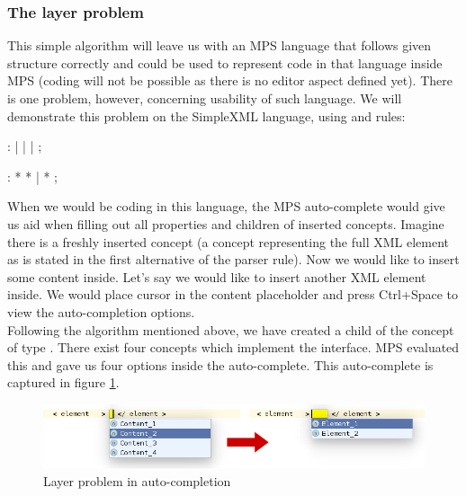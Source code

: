 \subsubsection{The layer problem}

This simple algorithm will leave us with an MPS language that follows given structure correctly and could be used to represent code in that language inside MPS (coding will not be possible as there is no editor aspect defined yet). There is one problem, however, concerning usability of such language. We will demonstrate this problem on the SimpleXML language, using  and  rules:

\begin{antlr}
	    :   
           |   
           |   
           |   
           ;
	
	    :   \literal{<}  * \literal{>} * \literal{</}  \literal{>}
           |   \literal{<}  * \literal{/>}
           ;	
\end{antlr} 

When we would be coding in this language, the MPS auto-complete would give us aid when filling out all properties and children of inserted concepts. Imagine there is a freshly inserted  concept (a concept representing the full XML element as is stated in the first alternative of the  parser rule). Now we would like to insert some content inside. Let's say we would like to insert another XML element inside. We would place cursor in the content placeholder and press Ctrl+Space to view the auto-completion options.
\\

Following the algorithm mentioned above, we have created a child of the  concept of type . There exist four concepts which implement the  interface. MPS evaluated this and gave us four options inside the auto-complete. This auto-complete is captured in figure \ref{fig:layer_problem}.

\begin{figure}[h]
	\centering
	\includegraphics[width=\textwidth]{../img/layer_problem.png}
	\caption{Layer problem in auto-completion}
	\label{fig:layer_problem}
\end{figure}


